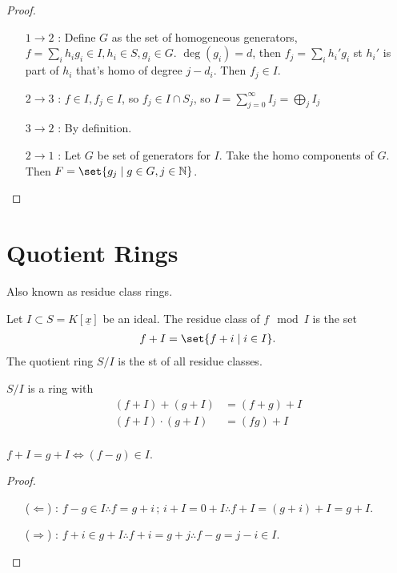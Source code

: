 \begin{proof}\phantom{.}
\begin{enumerate}
    \item[$1 \to 2$]: Define $G$ as the set of homogeneous generators, $f = \sum_i h_i g_i \in I, h_i \in S, g_i \in G$. $\deg (g_i) = d$, then $f_j = \sum_i h_i' g_i$ st $h_i'$ is part of $h_i$ that's homo of degree $j - d_i$. Then $f_j \in I$.
    \item[$2 \to 3$]: $f \in I, f_j \in I$, so $f_j \in I\cap S_j$, so $I = \sum_{j=0}^\infty I_j = \bigoplus_j I_j$
    \item[$3 \to 2$]: By definition.
    \item[$2 \to 1$]: Let $G$ be set of generators for $I$. Take the homo components of $G$. Then $F = \set{ g_j \mid g \in G, j \in \N}$.
\end{enumerate}
\end{proof}

\section{Quotient Rings}
Also known as residue class rings.

\begin{definition}
Let $I \subset S = K[\underline{x}]$ be an ideal. The residue class of $f \mod I$ is the set
\begin{align*}
    f + I = \set{f + i \mid i \in I}.
\end{align*}
The quotient ring $S/I $ is the st of all residue classes.
\end{definition}

\begin{remark}
$S/I$ is a ring with
\begin{align*}
    (f+ I) + (g+ I) &= (f+g) + I\\
    (f+ I) \cdot (g+ I) &= (fg) + I\\
\end{align*}
\end{remark}

\begin{proposition}
$f+ I = g+ I \iff (f-g) \in I$.
\end{proposition}

\begin{proof}
\phantom{.}
\begin{enumerate}
    \item[($\Leftarrow$)]: $f-g \in I \therefore f = g + i \, ; \, i + I = 0 + I \therefore f + I = (g+ i) + I = g+ I $.
    \item[($\Rightarrow$)]: $f + i \in g + I \therefore f+ i = g+j \therefore f-g = j-i \in I$.
\end{enumerate}
\end{proof}


